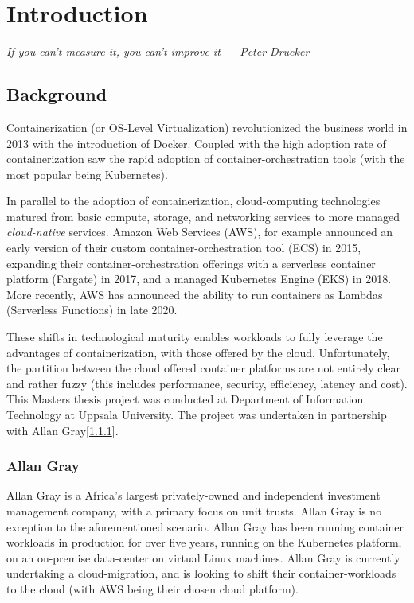 \chapter{Introduction}
\label{sec:intro}
\textit{If you can't measure it, you can't improve it --- Peter Drucker}

\section{Background}
Containerization (or OS-Level Virtualization) revolutionized the business world in 2013\cite{virtualization} with the introduction of Docker\cite{docker_usage}.
Coupled with the high adoption rate of containerization saw the rapid adoption of container-orchestration tools (with the most popular being Kubernetes\cite{k8s}).

In parallel to the adoption of containerization, cloud-computing technologies matured from basic compute, storage,
and networking services\cite{barr_2009} to more managed \textit{cloud-native} services. Amazon Web Services (AWS),
for example announced an early version of their custom container-orchestration tool (ECS) in 2015\cite{ecs},
expanding their container-orchestration offerings with a serverless container platform (Fargate) in 2017\cite{fargate},
and a managed Kubernetes Engine (EKS) in 2018\cite{eks}.
More recently, AWS has announced the ability to run containers as Lambdas (Serverless Functions) in late 2020\cite{lambda}.

\noindent These shifts in technological maturity enables workloads to fully leverage the advantages of containerization, 
with those offered by the cloud.
Unfortunately, the partition between the cloud offered container platforms are not entirely clear and rather fuzzy
(this includes performance, security, efficiency, latency and cost).\\

\noindent This Masters thesis project was conducted at Department of Information Technology at Uppsala University.
The project was undertaken in partnership with Allan Gray[\ref{sec:allan_gray}].

\subsection{Allan Gray}
\label{sec:allan_gray}
Allan Gray\cite{allan_gray} is a Africa's largest privately-owned and independent investment management company, with a primary focus on unit trusts.
Allan Gray is no exception to the aforementioned scenario. Allan Gray has been running container workloads in production for over five years,
running on the Kubernetes platform, on an on-premise data-center on virtual Linux machines.
Allan Gray is currently undertaking a cloud-migration, and is looking to shift their container-workloads to the cloud (with AWS being their chosen cloud platform).


